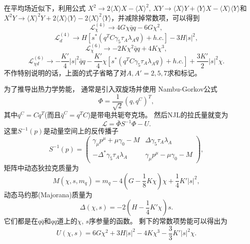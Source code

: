 在平均场近似下，利用公式
$X^2 \rightarrow 2\langle X \rangle X -  \langle X \rangle^2$,
$XY \rightarrow \langle X \rangle Y + \langle Y \rangle X -
\langle X \rangle \langle Y \rangle $和
$X^2Y \rightarrow \langle X \rangle^2 Y + 2\langle X \rangle \langle Y \rangle
- 2\langle X \rangle^2 \langle Y \rangle$，并减除掉常数项，可以得到
\begin{equation}
    \mathcal{L}^{(4)}_\chi \rightarrow 4G\chi \bar{q}q -6G\chi^2,
\end{equation}
\begin{equation}
    \mathcal{L}^{(4)}_d \rightarrow H[s^*(q^T C\gamma_5
    \tau_A \lambda_A q) + h.c.] - 3H|s|^2,
\end{equation}
\begin{equation}
    \mathcal{L}^{(6)}_\chi \rightarrow -2K\chi^2 \bar{q}q + 4K\chi^3,
\end{equation}
\begin{equation}
    \mathcal{L}^{(6)}_{\chi d} \rightarrow
    -\frac{K'}{4}|s|^2\bar{q}q -\frac{K'}{4}\chi[s^*(q^TC
    \gamma_5\tau_A\lambda_A q) +h.c.] + \frac{3K'}{2}|s|^2\chi.
\end{equation}
不作特别说明的话，上面的式子省略了对$A,A' = 2,5,7$求和标记。

为了推导出热力学势能， 通常是引入双旋场并使用 Nambu-Gorkov公式
\begin{equation}
    \Phi = \frac{1}{\sqrt{2}}(q, q^C)^T,
\end{equation}
其中$q^C = Cq^T$(而且$\bar{q}^C = q^T C$)是带电共轭夸克场。
然后NJL的拉氏量就变为
\begin{equation}
    \mathcal{L} = \bar{\Phi}S^{-1}\Phi - U.
\end{equation}
这里$S^{-1}(p)$是动量空间上的反传播子
\begin{equation}
    S^{-1}(p) =
\begin{pmatrix}
\gamma_\mu p^\mu + \mu \gamma_0 - M & \Delta \gamma_5 \tau_A \lambda_A \\
-\Delta^* \gamma_5 \tau_A \lambda_A & \gamma_\mu p^\mu - \mu \gamma_0 - M
\end{pmatrix},
\end{equation}
矩阵中动态狄拉克质量为
\begin{equation}
    M(\chi,s,m_q) = m_q - 4(G-\frac{1}{8}K\chi)\chi +\frac{1}{4}K'|s|^2,
\end{equation}
动态马约那(Majorana)质量为
\begin{equation}
    \Delta(\chi, s) = -2(H -\frac{1}{4}K'\chi)s.
\end{equation}
它们都是在$q\bar{q}$和$qq$道上的$\chi$, $s$序参量的函数。
剩下的常数项势能可以得出为
\begin{equation}
    U(\chi, s) = 6G\chi^2 +3H|s|^2 - 4K \chi^3 -\frac{3}{3}K'|s|^2\chi.
\end{equation}

